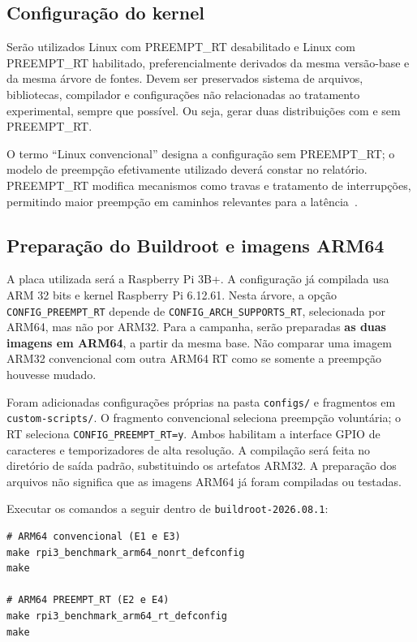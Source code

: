 \documentclass[11pt,a4paper]{article}
\begin{document}
\subsection{Configuração do kernel}

Serão utilizados Linux com PREEMPT\_RT desabilitado e Linux com PREEMPT\_RT habilitado, preferencialmente derivados da mesma versão-base e da mesma árvore de fontes. Devem ser preservados sistema de arquivos, bibliotecas, compilador e configurações não relacionadas ao tratamento experimental, sempre que possível. Ou seja, gerar duas distribuições com e sem PREEMPT\_RT. 

O termo ``Linux convencional'' designa a configuração sem PREEMPT\_RT; o modelo de preempção efetivamente utilizado deverá constar no relatório. %
PREEMPT\_RT modifica mecanismos como travas e tratamento de interrupções, permitindo maior preempção em caminhos relevantes para a latência~\cite{rt-theory}.



\subsection{Preparação do Buildroot e imagens ARM64}

A placa utilizada será a Raspberry Pi 3B+. A configuração já compilada usa ARM
32 bits e kernel Raspberry Pi 6.12.61. Nesta árvore, a opção
\texttt{CONFIG\_PREEMPT\_RT} depende de \texttt{CONFIG\_ARCH\_SUPPORTS\_RT},
selecionada por ARM64, mas não por ARM32. Para a campanha, serão preparadas
\textbf{as duas imagens em ARM64}, a partir da mesma base. Não comparar uma
imagem ARM32 convencional com outra ARM64 RT como se somente a preempção
houvesse mudado.

Foram adicionadas configurações próprias na pasta \texttt{configs/} e fragmentos
em \texttt{custom-scripts/}. O fragmento convencional seleciona preempção
voluntária; o RT seleciona \texttt{CONFIG\_PREEMPT\_RT=y}. Ambos habilitam a
interface GPIO de caracteres e temporizadores de alta resolução. A compilação
será feita no diretório de saída padrão, substituindo os artefatos ARM32. A
preparação dos arquivos não significa que as imagens ARM64 já foram compiladas
ou testadas.

Executar os comandos a seguir dentro de \texttt{buildroot-2026.08.1}:
\begin{lstlisting}
# ARM64 convencional (E1 e E3)
make rpi3_benchmark_arm64_nonrt_defconfig
make 

# ARM64 PREEMPT_RT (E2 e E4)
make rpi3_benchmark_arm64_rt_defconfig
make
\end{lstlisting}
\end{document}

